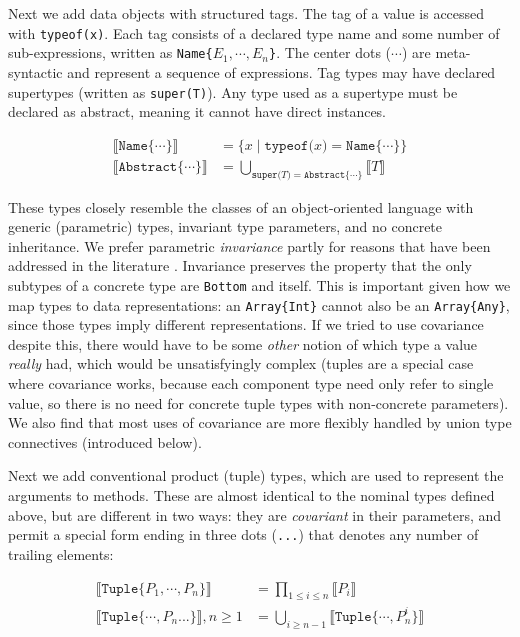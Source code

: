 Next we add data objects with structured tags.
The tag of a value is accessed with \texttt{typeof(x)}.
Each tag consists of a declared type name and some number of sub-expressions,
written as \texttt{Name\{}$E_1, \cdots, E_n$\texttt{\}}.
The center dots ($\cdots$) are meta-syntactic and represent a sequence of expressions.
Tag types may have declared supertypes (written as \texttt{super(T)}).
Any type used as a supertype must be declared as abstract, meaning it
cannot have direct instances.

\vspace{-3ex}
\begin{align*}
  \llbracket \texttt{Name\{}\cdots\texttt{\}} \rrbracket &= \{ x\mid \texttt{typeof(}x\texttt{)} = \texttt{Name\{}\cdots\texttt{\}} \} \\
  \llbracket \texttt{Abstract\{}\cdots\texttt{\}} \rrbracket &= \bigcup_{\texttt{super(}T\texttt{)} = \texttt{Abstract\{}\cdots\texttt{\}}} \llbracket T \rrbracket
\end{align*}

These types closely resemble the classes of an object-oriented language with
generic (parametric) types, invariant type parameters, and no concrete inheritance.
We prefer parametric \emph{invariance} partly for reasons that have been addressed in the
literature \cite{Day:1995:SVC:217838.217852}.
Invariance preserves the property that the only subtypes of a concrete type are \texttt{Bottom}
and itself.
This is important given how we map types to data representations: an \texttt{Array\{Int\}}
cannot also be an \texttt{Array\{Any\}}, since those types imply different
representations.
If we tried to use covariance despite this, there would have to be some \emph{other}
notion of which type a value \emph{really} had, which would be unsatisfyingly
complex
(tuples are a special case where covariance works, because each component type need
only refer to single value, so there is no need for concrete
tuple types with non-concrete parameters).
We also find that most uses of covariance are more flexibly
handled by union type connectives (introduced below).

Next we add conventional product (tuple) types, which are used to represent the
arguments to methods. These are almost identical to the nominal types defined above,
but are different in two ways: they are \emph{covariant} in their parameters, and permit
a special form ending in three dots (\texttt{...}) that denotes any number of trailing
elements:

\vspace{-3ex}
\begin{align*}
  \llbracket \texttt{Tuple\{}P_1,\cdots,P_n\texttt{\}} \rrbracket &= \prod_{1\leq i \leq n} \llbracket P_i \rrbracket \\
  \llbracket \texttt{Tuple\{}\cdots,P_n\texttt{...\}} \rrbracket, n\geq 1 &= \bigcup_{i\geq n-1} \llbracket \texttt{Tuple\{}\cdots,P_n^i\texttt{\}} \rrbracket
\end{align*}

